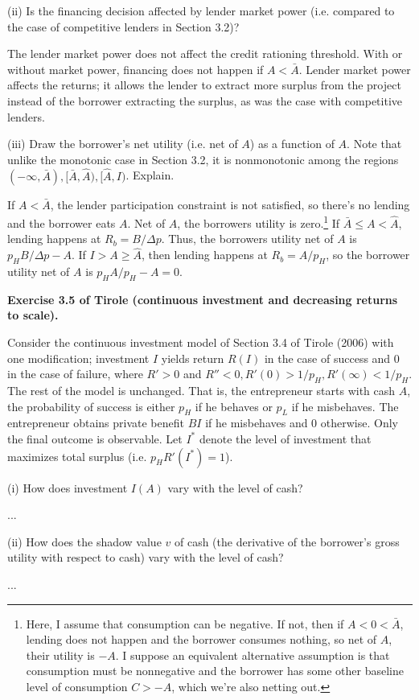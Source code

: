 \documentclass{article}
\begin{document}
\bigskip

(ii) Is the financing decision affected by lender market power (i.e. compared to the case of competitive lenders in Section 3.2)?

\bigskip

The lender market power does not affect the credit rationing threshold. With or without market power, financing does not happen if $A < \bar{A}$.  Lender market power affects the returns; it allows the lender to extract more surplus from the project instead of the borrower extracting the surplus, as was the case with competitive lenders.

\bigskip

(iii) Draw the borrower's net utility (i.e. net of $A$) as a function of $A$. Note that unlike the monotonic case in Section 3.2, it is nonmonotonic among the regions $(-\infty, \bar{A}), [\bar{A}, \hat{A}), [\hat{A}, I)$. Explain.

\bigskip

If $A < \bar{A}$, the lender participation constraint is not satisfied, so there's no lending and the borrower eats $A$. Net of $A$, the borrowers utility is zero.\footnote{Here, I assume that consumption can be negative.  If not, then if $A < 0 < \bar{A}$, lending does not happen and the borrower consumes nothing, so net of $A$, their utility is $-A$.  I suppose an equivalent alternative assumption is that consumption must be nonnegative and the borrower has some other baseline level of consumption $C > -A$, which we're also netting out.}  If $\bar{A} \le A < \hat{A}$, lending happens at $R_b = B/\Delta p$. Thus, the borrowers utility net of $A$ is $p_HB/\Delta p - A$.  If $I >A \ge \hat{A}$, then lending happens at $R_b = A/p_H$, so the borrower utility net of $A$ is $p_HA/p_H - A = 0$.

\pagebreak

\textbf{Exercise 3.5 of Tirole (continuous investment and decreasing returns to scale).} 

\bigskip

Consider the continuous investment model of Section 3.4 of Tirole (2006) with one modification; investment $I$ yields return $R(I)$ in the case of success and 0 in the case of failure, where $R' > 0$ and $R'' < 0, R'(0) > 1/p_H, R'(\infty) < 1/p_H$. The rest of the model is unchanged. That is, the entrepreneur starts with cash $A$, the probability of success is either $p_H$ if he behaves or $p_L$ if he misbehaves. The entrepreneur obtains private benefit $BI$ if he misbehaves and 0 otherwise. Only the final outcome is observable. Let $I^*$ denote the level of investment that maximizes total surplus (i.e. $p_H R'(I^*) = 1$).

\bigskip

(i) How does investment $I(A)$ vary with the level of cash?

\bigskip

...

\bigskip

(ii) How does the shadow value $v$ of cash (the derivative of the borrower's gross utility with respect to cash) vary with the level of cash?


\bigskip

...

\bigskip
\end{document}
